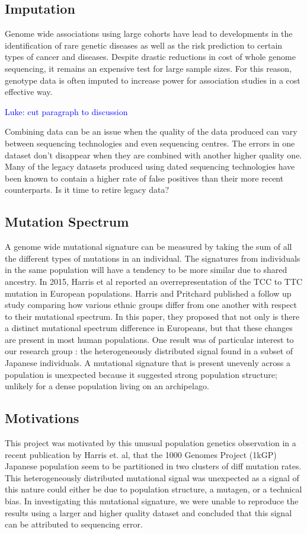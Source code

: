 \documentclass[9pt,lineno]{elife}
\newcommand{\luke}[1]{\textcolor{blue}{Luke: #1}}
\begin{document}
	\subsection{Imputation}
Genome wide associations using large cohorts have lead to developments in the identification of rare genetic diseases as well as the risk prediction to certain types of cancer and diseases. 
Despite drastic reductions in cost of whole genome sequencing, it remains an expensive test for large sample sizes.
For this reason, genotype data is often imputed to increase power for association studies in a cost effective way.

\luke{cut paragraph to discussion}

Combining data can be an issue when the quality of the data produced can vary between sequencing technologies and even sequencing centres.
The errors in one dataset don't disappear when they are combined with another higher quality one. 
Many of the legacy datasets produced using dated sequencing technologies have been known to contain a higher rate of false positives than their more recent counterparts.
Is it time to retire legacy data? 

	\subsection{Mutation Spectrum} 

A genome wide mutational signature can be measured by taking the sum of all the different types of mutations in an individual. 
The signatures from individuals in the same population will have a tendency to be more similar due to shared ancestry.
In 2015, Harris et al reported an overrepresentation of the TCC to TTC mutation in European populations.
Harris and Pritchard published a follow up study comparing how various ethnic groups differ from one another with respect to their mutational spectrum. 
In this paper, they proposed that not only is there a distinct mutational spectrum difference in Europeans, but that these changes are present in most human populations. 
One result was of particular interest to our research group : the heterogeneously distributed signal found in a subset of Japanese individuals. 
A mutational signature that is present unevenly across a population is unexpected because it suggested strong population structure; unlikely for a dense population living on an archipelago.

	\subsection{Motivations}
This project was motivated by this unusual population genetics observation in a recent publication by Harris et. al, that the 1000 Genomes Project (1kGP) Japanese population seem to be partitioned in two clusters of diff mutation rates. 
This heterogeneously distributed mutational signal was unexpected as a signal of this nature could either be due to population structure, a mutagen, or a technical bias.
In investigating this mutational signature, we were unable to reproduce the results using a larger and higher quality dataset and concluded that this signal can be attributed to sequencing error.
\end{document}
